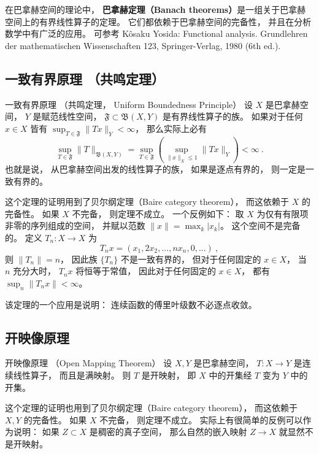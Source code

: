 

在巴拿赫空间的理论中， \textbf{巴拿赫定理（Banach theorems）}是一组关于巴拿赫空间上的有界线性算子的定理。 它们都依赖于巴拿赫空间的完备性， 并且在分析数学中有广泛的应用。 可参考 Kôsaku Yosida: Functional analysis. Grundlehren der mathematischen Wissenschaften 123, Springer-Verlag, 1980 (6th ed.).

\subsection{一致有界原理 （共鸣定理）}
\begin{theorem}{一致有界原理 （共鸣定理， Uniform Boundedness Principle）}
设 $X$ 是巴拿赫空间， $Y$ 是赋范线性空间， $\mathfrak{F}\subset\mathfrak{B}(X,Y)$ 是有界线性算子的族。 如果对于任何 $x\in X$ 皆有 $\sup_{T\in\mathfrak{F}}\|Tx\|_Y<\infty$， 那么实际上必有
$$
\sup_{T\in\mathfrak{F}}\|T\|_{\mathfrak{B}(X,Y)}
=\sup_{T\in\mathfrak{F}}\left(\sup_{\|x\|_X\leq 1}\|Tx\|_Y\right)<\infty~.
$$
也就是说， 从巴拿赫空间出发的线性算子的族， 如果是逐点有界的， 则一定是一致有界的。 
\end{theorem}
这个定理的证明用到了贝尔纲定理（Baire category theorem）， 而这依赖于 $X$ 的完备性。 如果 $X$ 不完备， 则定理不成立。 一个反例如下： 取 $X$ 为仅有有限项非零的序列组成的空间， 并赋以范数 $\|x\|=\max_{k}|x_k|$。 这个空间不是完备的。 定义 $T_n:X\to X$ 为
$$
T_nx=(x_1,2x_2,...,nx_n,0,...)~,
$$
则 $\|T_n\|=n$， 因此族 $\{T_n\}$ 不是一致有界的， 但对于任何固定的 $x\in X$， 当 $n$ 充分大时， $T_nx$ 将恒等于常值， 因此对于任何固定的 $x\in X$， 都有 $\sup_n\|T_nx\|<\infty$。

该定理的一个应用是说明： 连续函数的傅里叶级数不必逐点收敛。 

\subsection{开映像原理}
\begin{theorem}{开映像原理 （Open Mapping Theorem）}
设 $X,Y$ 是巴拿赫空间， $T:X\to Y$ 是连续线性算子， 而且是满映射。 则 $T$ 是开映射， 即 $X$ 中的开集经 $T$ 变为 $Y$ 中的开集。
\end{theorem}

这个定理的证明也用到了贝尔纲定理（Baire category theorem）， 而这依赖于 $X,Y$ 的完备性。 如果 $X$ 不完备， 则定理不成立。 实际上有很简单的反例可以作为说明： 如果 $Z\subset X$ 是稠密的真子空间， 那么自然的嵌入映射 $Z\to X$ 就显然不是开映射。

